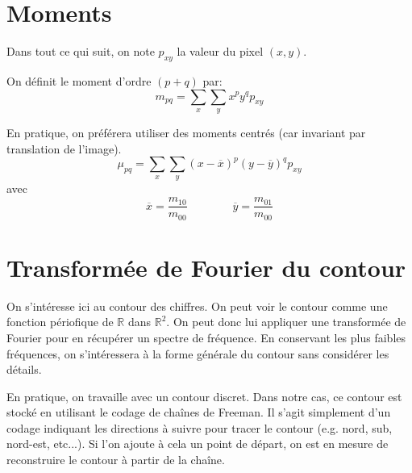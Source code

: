 \section{Moments}



Dans tout ce qui suit, on note $p_{xy}$ la valeur du pixel $(x,y)$.

On définit le moment d'ordre $(p+q)$ par:
\[
m_{pq} = \sum_x \sum_y x^p y^q p_{xy}
\]

En pratique, on préférera utiliser des moments centrés (car invariant 
par translation de l'image).
\[
\mu_{pq} = \sum_x \sum_y (x - \overline{x})^p (y - \overline{y})^q p_{xy}
\]
avec 
\[
\overline{x} = \frac{m_{10}}{m_{00}} \qquad \qquad \overline{y} = \frac{m_{01}}{m_{00}}
\]



\section{Transformée de Fourier du contour}

On s'intéresse ici au contour des chiffres. 
On peut voir le contour comme une fonction périofique 
de $\mathbb{R}$ dans $\mathbb{R}^2$. 
On peut donc lui appliquer une transformée de Fourier pour 
en récupérer un spectre de fréquence. 
En conservant les plus faibles fréquences, on s'intéressera à 
la forme générale du contour sans considérer les détails.

En pratique, on travaille avec un contour discret. 
Dans notre cas, ce contour est stocké en utilisant le codage 
de chaînes de Freeman.
Il s'agit simplement d'un codage indiquant les directions à suivre 
pour tracer le contour (e.g.\/ nord, sub, nord-est, etc...).
Si l'on ajoute à cela un point de départ, on est en mesure de 
reconstruire le contour à partir de la chaîne.

